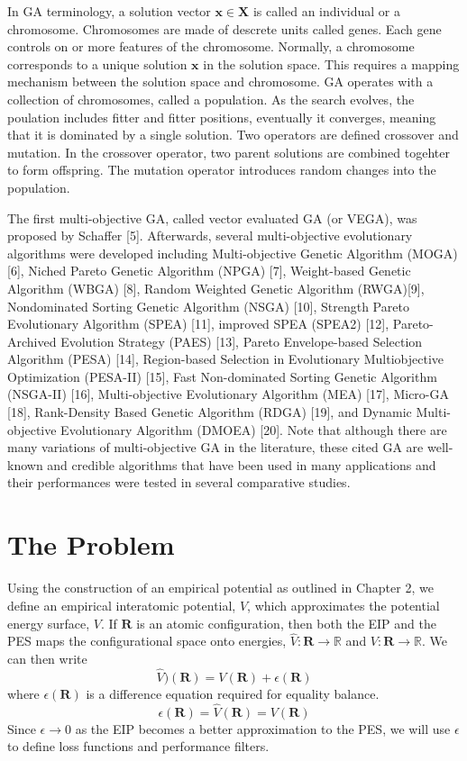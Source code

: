 In GA terminology, a solution vector $\bm{x}\in\bm{X}$ is called an individual or a chromosome.  Chromosomes are made of descrete units called genes.  Each gene controls on or more features of the chromosome.  Normally, a chromosome corresponds to a unique solution $\bm{x}$ in the solution space.  This requires a mapping mechanism between the solution space and chromosome.  GA operates with a collection of chromosomes, called a population.  As the search evolves, the poulation includes fitter and fitter positions, eventually it converges, meaning that it is dominated by a single solution.  Two operators are defined crossover and mutation.  In the crossover operator, two parent solutions are combined togehter to form offspring.  The mutation operator introduces random changes into the population.

The first multi-objective GA, called vector evaluated GA (or VEGA), was proposed by Schaffer [5]. Afterwards, several multi-objective evolutionary algorithms were developed including Multi-objective Genetic Algorithm (MOGA) [6], Niched Pareto Genetic Algorithm (NPGA) [7], Weight-based Genetic Algorithm (WBGA) [8], Random Weighted Genetic Algorithm (RWGA)[9], Nondominated Sorting Genetic Algorithm (NSGA) [10], Strength Pareto Evolutionary Algorithm (SPEA) [11], improved SPEA (SPEA2) [12], Pareto-Archived Evolution Strategy (PAES) [13], Pareto Envelope-based Selection Algorithm (PESA) [14], Region-based Selection in Evolutionary Multiobjective Optimization (PESA-II) [15], Fast Non-dominated Sorting Genetic Algorithm (NSGA-II) [16], Multi-objective Evolutionary Algorithm (MEA) [17], Micro-GA [18], Rank-Density Based Genetic Algorithm (RDGA) [19], and Dynamic Multi-objective Evolutionary Algorithm (DMOEA) [20]. Note that although there are many variations of multi-objective GA in the literature, these cited GA are well-known and credible algorithms that have been used in many applications and their performances were tested in several comparative studies.
\section{The Problem}

Using the construction of an empirical potential as outlined in Chapter 2, we define an empirical interatomic potential, $\hat{V}$, which approximates the potential energy surface, $V$.
If $\bm{R}$ is an atomic configuration, then both the EIP and the PES maps the configurational space onto energies, $\hat{V}:\bm{R} \rightarrow \mathbb{R}$ and $V:\bm{R} \rightarrow \mathbb{R}$.
We can then write
\begin{equation}
    \hat{V})(\bm{R}) = V(\bm{R}) + \epsilon(\bm{R})
\end{equation}
where $\epsilon(\bm{R})$ is a difference equation required for equality balance.
\begin{equation}
    \epsilon(\bm{R}) = \hat{V}(\bm{R}) = V(\bm{R})
\end{equation}
Since ${\epsilon \rightarrow 0}$ as the EIP becomes a better approximation to the PES, we will use $\epsilon$ to define loss functions and performance filters.

